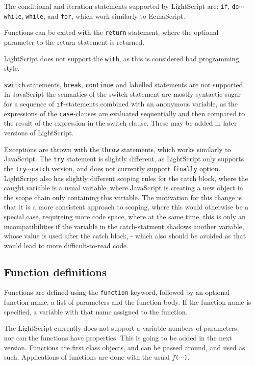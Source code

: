 \documentclass[11pt]{report}
\begin{document}
The conditional and iteration statements supported by LightScript are: \verb|if|, \verb|do|$\cdots$\verb|while|, \verb|while|, and \verb|for|, which work similarly to EcmaScript.

Functions can be exited with the \verb|return| statement, where the optional parameter to the return statement is returned.

LightScript does not support the \verb|with|, as this is considered bad programming style.

\verb|switch| statements, \verb|break|, \verb|continue| and labelled statements are not supported. In JavaScript the semantics of the switch statement are mostly syntactic sugar for a sequence of \verb|if|-statements combined with an anonymous variable, as the expressions of the \verb|case|-clauses are evaluated sequentially and then compared to the result of the expression in the switch clause.
These may be added in later versions of LightScript.

Exceptions are thrown with the \verb|throw| statements, which works similarly to JavaScript.
The \verb|try| statement is slightly different, as LightScript only supports the \verb|try|$\cdots$\verb|catch| version, and does not currently support \verb|finally| option.
LightScript also has slightly different scoping rules for the catch block, where the caught variable is a usual variable, where JavaScript is creating a new object in the scope chain only containing this variable. The motivation for this change is that it is a more consistent approach to scoping, where this would otherwise be a special case, requireing more code space, where at the same time, this is only an incompatibilities if the variable in the catch-statment shadows another variable, whose value is used after the catch block, - which also should be avoided as that would lead to more difficult-to-read code.

\subsection{Function definitions}
Functions are defined using the \verb|function| keyword, followed by an optional function name, a list of parameters and the function body.
If the function name is specified, a variable with that name assigned to the function.

The LightScript currently does not support a variable numbers of parameters, nor can the functions have properties.
This is going to be added in the next version.
Functions are first class objects, and can be passed around, and used as such. Applications of functions are done with the usual $f$\verb|(|$\cdots$\verb|)|.
\end{document}
